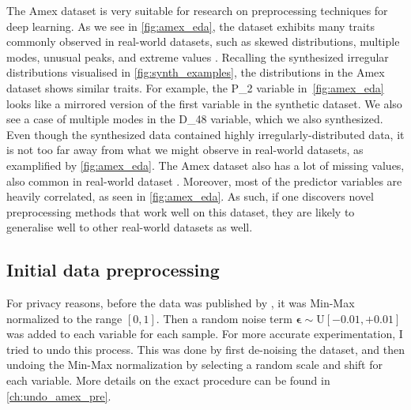 \documentclass{statsmsc}
\begin{document}
{%
The Amex dataset is very suitable for research on preprocessing techniques for
deep learning. As we see in \cref{fig:amex_eda}, the dataset exhibits many traits commonly observed in
real-world datasets, such as skewed distributions, multiple modes, unusual
peaks, and extreme values \citep{nawi}. 
Recalling the synthesized irregular distributions visualised in \cref{fig:synth_examples},
the distributions in the Amex dataset shows similar traits. For example, the
P\_2 variable in\ \cref{fig:amex_eda} looks like a mirrored version of the first variable in the
synthetic dataset. We also see a case of multiple modes in the D\_48 variable, which we
also synthesized. Even though the synthesized data contained highly irregularly-distributed data,
it is not too far away from what we might observe in real-world datasets, as examplified
by \cref{fig:amex_eda}.
The Amex dataset also has a lot of missing values, also common in
real-world dataset \citep{nawi, brits}. Moreover, most of the predictor variables are heavily
correlated, as seen in \cref{fig:amex_eda}.
As such, if one discovers novel preprocessing methods that
work well on this dataset, they are likely to generalise well to other real-world datasets as well.


\subsection{Initial data preprocessing}%
\label{sub:Data formatting}

For privacy reasons, before the data was published by \cite{amex-data}, it was Min-Max
normalized to the range $[0, 1]$. Then a random noise term $\bm\epsilon \sim
\textrm{U}[-0.01,+0.01]$ was added to each variable for each sample.
For more accurate experimentation, I tried to undo this process. This was
done by first de-noising the dataset, and then undoing the Min-Max normalization by selecting
a random scale and shift for each variable. More details on the exact procedure can be found
in  \cref{ch:undo_amex_pre}.

}
\end{document}
